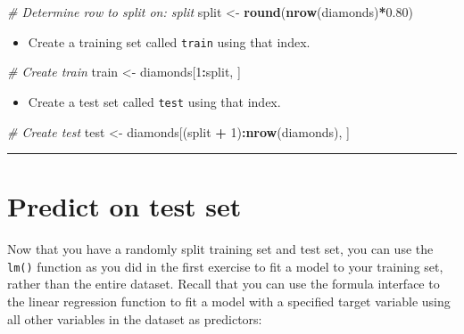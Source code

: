 \documentclass[]{book}
\newenvironment{Shaded}{\begin{snugshade}}{\end{snugshade}}
\newcommand{\KeywordTok}[1]{\textcolor[rgb]{0.13,0.29,0.53}{\textbf{#1}}}
\newcommand{\DecValTok}[1]{\textcolor[rgb]{0.00,0.00,0.81}{#1}}
\newcommand{\FloatTok}[1]{\textcolor[rgb]{0.00,0.00,0.81}{#1}}
\newcommand{\StringTok}[1]{\textcolor[rgb]{0.31,0.60,0.02}{#1}}
\newcommand{\CommentTok}[1]{\textcolor[rgb]{0.56,0.35,0.01}{\textit{#1}}}
\newcommand{\OperatorTok}[1]{\textcolor[rgb]{0.81,0.36,0.00}{\textbf{#1}}}
\newcommand{\NormalTok}[1]{#1}
\providecommand{\tightlist}{%
  \setlength{\itemsep}{0pt}\setlength{\parskip}{0pt}}
\begin{document}
\begin{Shaded}
\begin{Highlighting}[]
\CommentTok{# Determine row to split on: split}
\NormalTok{split <-}\StringTok{ }\KeywordTok{round}\NormalTok{(}\KeywordTok{nrow}\NormalTok{(diamonds)}\OperatorTok{*}\FloatTok{0.80}\NormalTok{)}
\end{Highlighting}
\end{Shaded}

\begin{itemize}
\tightlist
\item
  Create a training set called \texttt{train} using that index.
\end{itemize}

\begin{Shaded}
\begin{Highlighting}[]
\CommentTok{# Create train}
\NormalTok{train <-}\StringTok{ }\NormalTok{diamonds[}\DecValTok{1}\OperatorTok{:}\NormalTok{split, ]}
\end{Highlighting}
\end{Shaded}

\begin{itemize}
\tightlist
\item
  Create a test set called \texttt{test} using that index.
\end{itemize}

\begin{Shaded}
\begin{Highlighting}[]
\CommentTok{# Create test}
\NormalTok{test <-}\StringTok{ }\NormalTok{diamonds[(split }\OperatorTok{+}\StringTok{ }\DecValTok{1}\NormalTok{)}\OperatorTok{:}\KeywordTok{nrow}\NormalTok{(diamonds), ]}
\end{Highlighting}
\end{Shaded}

\begin{center}\rule{0.5\linewidth}{\linethickness}\end{center}

\section{Predict on test set}\label{predict-on-test-set}

Now that you have a randomly split training set and test set, you can
use the \texttt{lm()} function as you did in the first exercise to fit a
model to your training set, rather than the entire dataset. Recall that
you can use the formula interface to the linear regression function to
fit a model with a specified target variable using all other variables
in the dataset as predictors:
\end{document}
